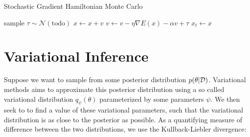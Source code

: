 \begin{algorithm}[H]
    \caption{Stochastic Gradient Hamiltonian Monte Carlo} \label{alg:sghmc}
    \begin{algorithmic}
        \State sample $\tau \sim \mathcal{N}(\text{todo})$
        \State $x\gets x + v $ 
        \State $v\gets v - \eta \nabla E(x) - \alpha v + \tau$
        \EndFor
        \State $x_{t} \gets x$
        \EndFor
    \end{algorithmic}
\end{algorithm}


\section{Variational Inference}

Suppose we want to sample from some posterior distribution $p(\theta | \mathcal{D})$. 
Variational methods aims to approximate this posterior distribution using a so called variational distribution $q_\psi (\theta)$ parameterized by some parameters $\psi$.  
We then seek to to find a value of these variational parameters, such that the variational distribution is as close to the posterior as possible. 
As a quantifying measure of difference between the two distributions, we use the Kullback-Liebler divergence:


